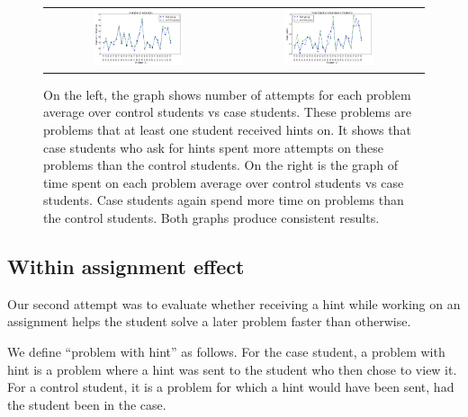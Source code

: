 \documentclass{llncs}
\begin{document}
\fi
\begin{figure}[ht]
\centering
   \begin{tabular}{c c}
		\includegraphics[width=0.5\textwidth]{image/new_tries_analysis.png} &
		\includegraphics[width=0.5\textwidth]{image/new_times_analysis.png}
	\end{tabular}
\caption{On the left, the graph shows number of attempts for each problem average over control students vs case students. These problems are problems that at least one student received hints on. It shows that case students who ask for hints spent more attempts on these problems than the control students. On the right is the graph of time spent on each problem average over control students vs case students. Case students again spend more time on problems than the control students. Both graphs produce consistent results.}
    \label{fig:tries_times_analysis}
\end{figure}

\subsection{Within assignment effect}

Our second attempt was to evaluate whether receiving a hint while
working on an assignment helps the student solve a later problem faster
than otherwise.

We define ``problem with hint'' as follows. For the case student, a
problem with hint is a problem where a hint was sent to the student
who then chose to view it. For a control student, it is a problem for
which a hint would have been sent, had the student been in the case.
\end{document}
